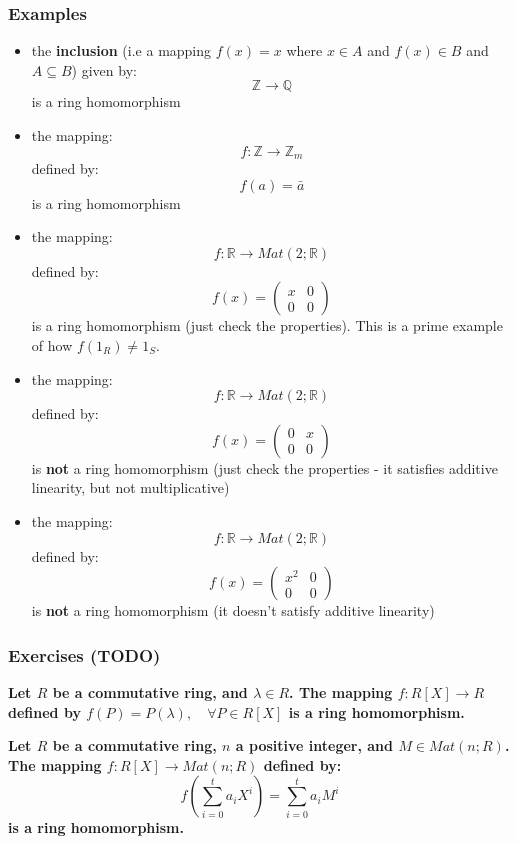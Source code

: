 \documentclass{exam}
\begin{document}
\subsubsection{Examples}

\begin{itemize}
    \item the \textbf{inclusion} (i.e a mapping $f(x) = x$ where $x \in A$ and $f(x) \in B$ and $A \subseteq B$) given by:
    \[
    \mathbb{Z} \to \mathbb{Q}
    \]
    is a ring homomorphism
    \item the mapping:
    \[
    f : \mathbb{Z} \to \mathbb{Z}_m
    \]
    defined by:
    \[
    f(a) = \bar{a}
    \]
    is a ring homomorphism
    \item the mapping:
    \[
    f : \mathbb{R} \to Mat(2;\mathbb{R})
    \]
    defined by:
    \[
    f(x) = \begin{pmatrix}
    x & 0 \\
    0 & 0
    \end{pmatrix}
    \]
    is a ring homomorphism (just check the properties). This is a prime example of how $f(1_R) \neq 1_S$.
    \item the mapping:
    \[
    f : \mathbb{R} \to Mat(2;\mathbb{R})
    \]
    defined by:
    \[
    f(x) = \begin{pmatrix}
    0 & x \\
    0 & 0
    \end{pmatrix}
    \]
    is \textbf{not} a ring homomorphism (just check the properties - it satisfies additive linearity, but not multiplicative)
    \item the mapping:
    \[
    f : \mathbb{R} \to Mat(2;\mathbb{R})
    \]
    defined by:
    \[
    f(x) = \begin{pmatrix}
    x^2 & 0 \\
    0 & 0
    \end{pmatrix}
    \]
    is \textbf{not} a ring homomorphism (it doesn't satisfy additive linearity)
\end{itemize}

\subsubsection{Exercises (TODO)}

\begin{questions}

\question \textbf{Let $R$ be a commutative ring, and $\lambda \in R$. The mapping $f : R[X] \to R$ defined by $f(P) = P(\lambda), \quad \forall P \in R[X]$ is a ring homomorphism.}

\question \textbf{Let $R$ be a commutative ring, $n$ a positive integer, and $M \in Mat(n; R)$. The mapping $f : R[X] \to Mat(n;R)$ defined by:
\[
f\left(\sum_{i = 0}^t a_iX^i\right) = \sum_{i = 0}^t a_iM^i
\]
is a ring homomorphism.}

\end{questions}
\end{document}
